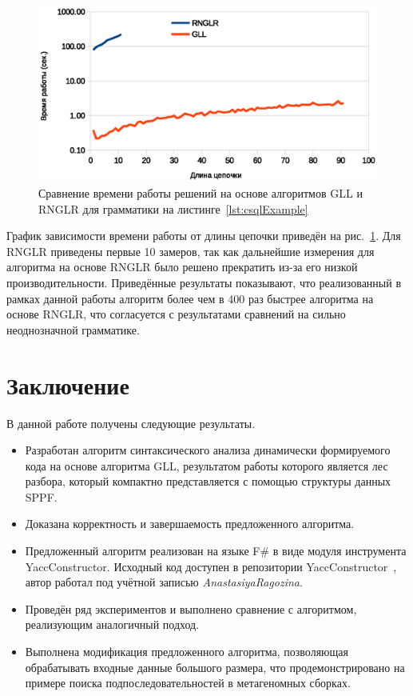 \documentclass[14pt]{matmex-diploma}
\begin{document}
\begin{figure}
 \centering
 \includegraphics[width=15cm]{pics/BioLog.eps}
 \caption{Сравнение времени работы решений на основе алгоритмов GLL и RNGLR для грамматики на листинге~\ref{lst:csqlExample}}
 \label{fig:Stack}
\end{figure}

График зависимости времени работы от длины цепочки приведён на рис.~\ref{fig:Stack}. Для RNGLR приведены первые 10 замеров, так как дальнейшие измерения для алгоритма на основе RNGLR было решено прекратить из-за его низкой производительности. Приведённые результаты показывают, что реализованный в рамках данной работы алгоритм более чем в 400 раз быстрее алгоритма на основе RNGLR, что согласуется с результатами сравнений на сильно неоднозначной грамматике.

\section*{Заключение}
В данной работе получены следующие результаты.
\begin{itemize}
\item Разработан алгоритм синтаксического анализа динамически  формируемого кода на основе алгоритма GLL, результатом работы которого является лес разбора, который компактно представляется с помощью структуры данных SPPF.
\item Доказана корректность и завершаемость предложенного алгоритма.
\item Предложенный алгоритм реализован на языке F\# в виде модуля инструмента YaccConstructor. Исходный код доступен в репозитории YaccConstructor~\cite{YCUrl}, автор работал под учётной записью \textit{AnastasiyaRagozina}.
\item Проведён ряд экспериментов и выполнено сравнение с алгоритмом, реализующим аналогичный подход.
\item Выполнена модификация предложенного алгоритма, позволяющая обрабатывать входные данные большого размера, что продемонстрировано на примере поиска подпоследовательностей в метагеномных сборках.
\end{itemize}
\end{document}
